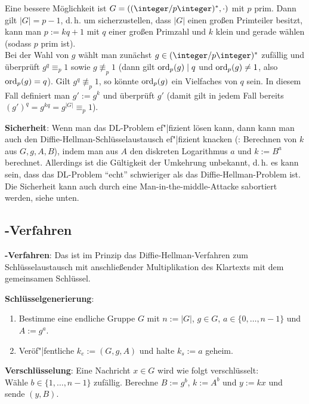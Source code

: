 Eine bessere Möglichkeit ist $G = ((\ZpZ)^\ast, \cdot)$ mit $p$ prim.
Dann gilt $|G| = p - 1$,
d.\,h. um sicherzustellen, dass $|G|$ einen großen Primteiler besitzt, kann man
$p := kq + 1$ mit $q$ einer großen Primzahl und $k$ klein und gerade wählen
(sodass $p$ prim ist).\\
Bei der Wahl von $g$ wählt man zunächst $g \in (\ZpZ)^\ast$ zufällig und überprüft
$g^q \equiv_p 1$ sowie $g \not\equiv_p 1$
(dann gilt $\operatorname{ord}_p(g) \mid q$ und $\operatorname{ord}_p(g) \not= 1$, also $\operatorname{ord}_p(g) = q$).
Gilt $g^q \not\equiv_p 1$, so könnte $\operatorname{ord}_p(g)$ ein Vielfaches von $q$ sein.
In diesem Fall definiert man $g' := g^k$ und überprüft $g'$
(damit gilt in jedem Fall bereits $(g')^q = g^{kq} = g^{|G|} \equiv_p 1$).

\linie

\textbf{Sicherheit}:
Wenn man das DL-Problem ef"|fizient lösen kann, dann kann man auch den
Diffie-Hellman-Schlüsselaustausch ef"|fizient knacken
(: Berechnen von $k$ aus $G, g, A, B$),
indem man aus $A$ den diskreten Logarithmus $a$ und $k := B^a$ berechnet.
Allerdings ist die Gültigkeit der Umkehrung unbekannt,
d.\,h. es kann sein, dass das DL-Problem "`echt"' schwieriger als das Diffie-Hellman-Problem ist.
Die Sicherheit kann auch durch eine Man-in-the-middle-Attacke sabortiert werden, siehe unten.

\pagebreak

\subsection{%
    -Verfahren%
}

\textbf{-Verfahren}:
Das  ist im Prinzip das Diffie-Hellman-Verfahren zum
Schlüsselaustausch mit anschließender Multiplikation des Klartexts mit dem gemeinsamen Schlüssel.

\textbf{Schlüsselgenerierung}:
\begin{enumerate}
    \item
    Bestimme eine endliche Gruppe $G$ mit $n := |G|$, $g \in G$, $a \in \{0, \dotsc, n - 1\}$
    und $A := g^a$.
    
    \item
    Veröf"|fentliche $k_e := (G, g, A)$ und halte $k_s := a$ geheim.
\end{enumerate}

\textbf{Verschlüsselung}:
Eine Nachricht $x \in G$ wird wie folgt verschlüsselt:\\
Wähle $b \in \{1, \dotsc, n - 1\}$ zufällig.
Berechne $B := g^b$, $k := A^b$ und $y := kx$ und sende $(y, B)$.

